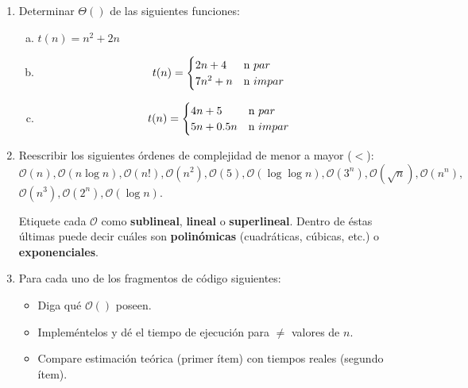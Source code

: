\begin{enumerate}
	\item Determinar $\Theta()$ de las siguientes funciones:
		\begin{enumerate}[a)]
			\item $t(n)=n^2 + 2n$ 
			\item \begin{equation*}
    t(n) = \begin{cases}
               2n + 4               & $n $ par\\
               7n^2 + n               & $n $ impar\\
           \end{cases}
		\end{equation*}
			\item \begin{equation*}
    t(n) = \begin{cases}
               4n + 5               & $n $ par\\
               5n + 0.5n               & $n $ impar\\
           \end{cases}
		\end{equation*}

		\end{enumerate}	
		
	\item Reescribir los siguientes órdenes de complejidad de menor a mayor ($<$):\\
	$\mathcal{O}(n), \mathcal{O}(n\log n), \mathcal{O}(n!), \mathcal{O}(n^2), \mathcal{O}(5),
	\mathcal{O}(\log\log n), \mathcal{O}(3^n), \mathcal{O}(\sqrt{n}), \mathcal{O}(n^n),$ \\
	 $\mathcal{O}(n^3), \mathcal{O}(2^n), \mathcal{O}(\log n)$. 
	 
	 Etiquete cada $\mathcal{O}$ como
	 \textbf{sublineal}, \textbf{lineal} o \textbf{superlineal}. Dentro de éstas últimas puede
	 decir cuáles son \textbf{polinómicas} (cuadráticas, cúbicas, etc.) o \textbf{exponenciales}.
		
		
	\item Para cada uno de los fragmentos de código siguientes:
	\vspace{-3mm}
	\begin{itemize}
		\item Diga qué $ \mathcal{O}()$ poseen.
		\item Impleméntelos y dé el tiempo de ejecución para $\neq$ valores de $n$.
		\item Compare estimación teórica (primer ítem) con tiempos reales (segundo ítem).
	\end{itemize}
	

\end{enumerate}
